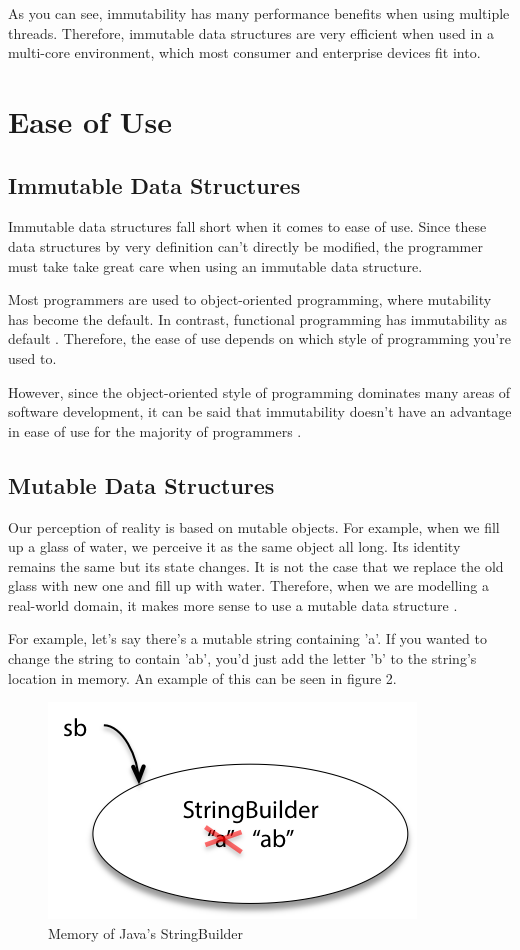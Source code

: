 \documentclass[11pt]{article}
\begin{document}
As you can see, immutability has many performance benefits when using multiple
threads. Therefore, immutable data structures are very efficient when used in a
multi-core environment, which most consumer and enterprise devices fit into.
\clearpage

\section{Ease of Use}
\subsection{Immutable Data Structures}
Immutable data structures fall short when it comes to ease of use. Since these
data structures by very definition can't directly be modified, the programmer
must take take great care when using an immutable data structure.

Most programmers are used to object-oriented programming, where mutability has
become the default. In contrast, functional programming has immutability as
default \cite{miles}. Therefore, the ease of use depends on which style of
programming you're used to.

However, since the object-oriented style of programming dominates many areas
of software development, it can be said that immutability doesn't have an
advantage in ease of use for the majority of programmers \cite{ieee_spectrum}.

\subsection{Mutable Data Structures}
Our perception of reality is based on mutable objects. For example, when we
fill up a glass of water, we perceive it as the same object all long. Its
identity remains the same but its state changes. It is not the case that we
replace the old glass with new one and fill up with water. Therefore, when we
are modelling a real-world domain, it makes more sense to use a mutable data
structure \cite{peter_toro}.

For example, let's say there's a mutable string containing 'a'. If you wanted
to change the string to contain 'ab', you'd just add the letter 'b' to the
string's location in memory. An example of this can be seen in figure 2.

\begin{figure}[H]
\centering

\includegraphics{string_builder}
\caption{Memory of Java's StringBuilder \cite{mit_reading_9}}

\end{figure}
\clearpage
\end{document}
